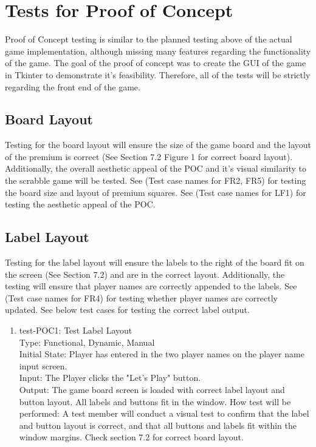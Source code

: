 \documentclass[12pt, titlepage]{article}
\begin{document}
\section{Tests for Proof of Concept}%
Proof of Concept testing is similar to the planned testing above of the actual game implementation, although missing many features regarding the functionality of the game. The goal of the proof of concept was to create the GUI of the game in Tkinter to demonstrate it's feasibility. Therefore, all of the tests will be strictly regarding the front end of the game. 

\subsection{Board Layout}

Testing for the board layout will ensure the size of the game board and the layout of the premium is correct (See Section 7.2 Figure 1 for correct board layout). Additionally, the overall aesthetic appeal of the POC and it's visual similarity to the scrabble game will be tested. See (Test case names for FR2, FR5) for testing the board size and layout of premium squares. See (Test case names for LF1) for testing the aesthetic appeal of the POC. 

\subsection{Label Layout}

Testing for the label layout will ensure the labels to the right of the board fit on the screen (See Section 7.2) and are in the correct layout. Additionally, the testing will ensure that player names are correctly appended to the labels. See (Test case names for FR4) for testing whether player names are correctly updated. See below test cases for testing the correct label output.

\begin{enumerate}
    \item{test-POC1: Test Label Layout\\} 
    Type: Functional, Dynamic, Manual\\
    Initial State: Player has entered in the two player names on the player name input screen. \\
    Input: The Player clicks the "Let's Play" button.\\
    Output: The game board screen is loaded with correct label layout and button layout. All labels and buttons fit in the window.
    How test will be performed: A test member will conduct a visual test to confirm that the label and button layout is correct, and that all buttons and labels fit within the window margins. Check section 7.2 for correct board layout.\\
\end{enumerate}
	
\end{document}

